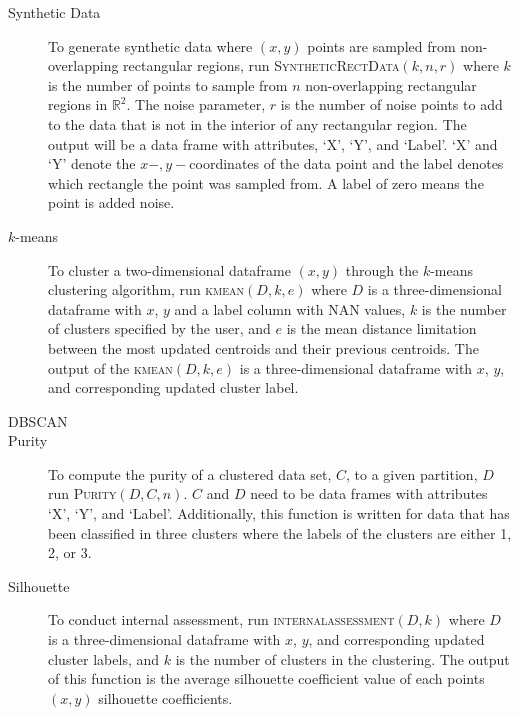 \documentclass[psamsfonts,onesided,10pt]{amsart}
\begin{document}
\begin{description}
\item[Synthetic Data] To generate synthetic data where $(x,y)$ points are sampled from 
non-overlapping rectangular regions, run \textsc{SyntheticRectData}$(k,n,r)$ where $k$ is the 
number of points to sample from $n$ non-overlapping rectangular regions in $\mathbb{R}^2$. 
The noise parameter, $r$  is the number of noise points to add to the data that is not in the interior 
of any rectangular region. The output will be a data frame with attributes, `X', `Y', and `Label'. 
`X' and `Y' denote the $x-,y-$coordinates of the data point and the label denotes which rectangle 
the point was sampled from. A label of zero means the point is added noise.
\item[$k$-means] To cluster a two-dimensional dataframe $(x,y)$ through the $k$-means 
clustering algorithm, run \textsc{kmean}$(D,k,e)$ where $D$ is a three-dimensional dataframe with 
$x$, $y$ and a label column with NAN values, $k$ is the number of clusters specified by the user, 
and $e$ is the mean distance limitation between the most updated centroids and their previous 
centroids. The output of the \textsc{kmean}$(D,k,e)$ is a three-dimensional dataframe with $x$, $y$, 
and corresponding updated cluster label.
\item[DBSCAN] \todo{}
\item[Purity]  To compute the purity of a clustered data set, $C$, to a given partition, $D$ run 
\textsc{Purity}$(D, C, n)$. $C$ and $D$ need to be data frames with 
attributes `X',  `Y', and `Label'. Additionally, this function is written for data that has been 
classified in three clusters where the labels of the clusters are either 1, 2, or 3. 
\item[Silhouette] To conduct internal assessment, run \textsc{internalassessment}$(D,k)$ 
where $D$ is a three-dimensional dataframe with $x$, $y$, and corresponding updated cluster 
labels, and $k$ is the number of clusters in the clustering. The output of this function is the 
average silhouette coefficient value of each points $(x,y)$ silhouette coefficients. 
\end{description}
 
\end{document}
